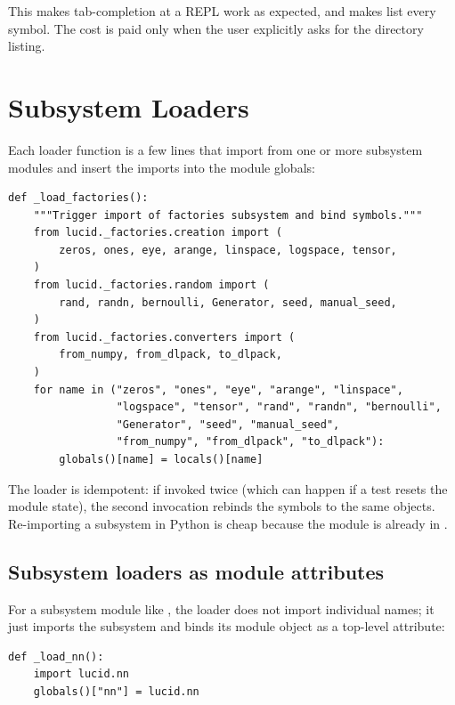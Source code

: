 This makes tab-completion at a REPL work as expected, and makes
 list every symbol. The cost is paid only when
the user explicitly asks for the directory listing.

\section{Subsystem Loaders}
\label{sec:lazy_imports:loaders}

Each loader function is a few lines that import from one or more
subsystem modules and insert the imports into the module globals:

\begin{lstlisting}[style=lucid,language=LucidPython]
def _load_factories():
    """Trigger import of factories subsystem and bind symbols."""
    from lucid._factories.creation import (
        zeros, ones, eye, arange, linspace, logspace, tensor,
    )
    from lucid._factories.random import (
        rand, randn, bernoulli, Generator, seed, manual_seed,
    )
    from lucid._factories.converters import (
        from_numpy, from_dlpack, to_dlpack,
    )
    for name in ("zeros", "ones", "eye", "arange", "linspace",
                 "logspace", "tensor", "rand", "randn", "bernoulli",
                 "Generator", "seed", "manual_seed",
                 "from_numpy", "from_dlpack", "to_dlpack"):
        globals()[name] = locals()[name]
\end{lstlisting}

The loader is idempotent: if invoked twice (which can happen if a
test resets the module state), the second invocation rebinds the
symbols to the same objects. Re-importing a subsystem in Python is
cheap because the module is already in .

\subsection{Subsystem loaders as module attributes}
\label{ssec:lazy_imports:subsystem_attr}

For a subsystem module like , the loader does not
import individual names; it just imports the subsystem and binds
its module object as a top-level attribute:

\begin{lstlisting}[style=lucid,language=LucidPython]
def _load_nn():
    import lucid.nn
    globals()["nn"] = lucid.nn
\end{lstlisting}

